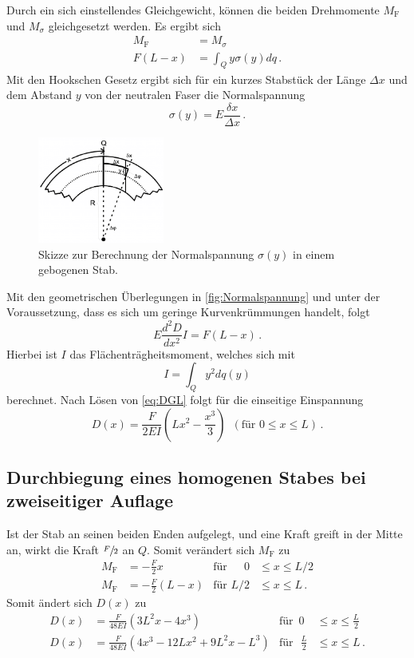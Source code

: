 Durch ein sich einstellendes Gleichgewicht, können die beiden Drehmomente $M_\text{F}$ und $M_\sigma$ gleichgesetzt werden.
Es ergibt sich
\begin{align*}
    M_\text{F} &= M_\sigma \\
    F(L-x) &= \int_{Q} y \sigma(y) dq  \, .
\end{align*}
Mit den Hookschen Gesetz ergibt sich für ein kurzes Stabstück der Länge $\Delta x$ und dem Abstand $y$ 
von der neutralen Faser die Normalspannung
\begin{equation*}
    \sigma (y) = E \frac{\delta x}{\Delta x} \, .
\end{equation*}
\begin{figure}
    \centering
    \includegraphics[height=3.5cm]{Abbildungen/Skizze_Normalspannung.pdf}
    \caption{Skizze zur Berechnung der Normalspannung $\sigma (y)$ in einem gebogenen Stab.}
    \label{fig:Normalspannung}
\end{figure}
Mit den geometrischen Überlegungen in \autoref{fig:Normalspannung}
und unter der Voraussetzung, dass es sich um geringe Kurvenkrümmungen handelt, folgt
\begin{equation} \label{eq:DGL}
    E \frac{d^2 D}{d x^2} I = F(L-x) \, .
\end{equation}
Hierbei ist $I$ das Flächenträgheitsmoment, welches sich mit
\begin{equation*}
    I = \int_{Q} y^2 dq(y)
\end{equation*}
berechnet.
Nach Lösen von \autoref{eq:DGL} folgt für die einseitige Einspannung
\begin{equation}
    D(x) = \frac{F}{2EI}(Lx^2-\frac{x^3}{3}) \, \, \, (\text{für } 0 \leq x \leq L) \, .
    \label{eq:polynom1}
\end{equation}

\subsection{Durchbiegung eines homogenen Stabes bei zweiseitiger Auflage}
Ist der Stab an seinen beiden Enden aufgelegt, und eine Kraft greift in der Mitte an, wirkt die Kraft
$\sfrac{F}{2}$ an $Q$.
Somit verändert sich $M_\text{F}$ zu
\begin{align*}
    M_\text{F} & = - \frac{F}{2} x &\text{für} \, \,\phantom{L/}0 &\leq x \leq L/2 \\
    M_\text{F} & = - \frac{F}{2} (L -x) &\text{für} \, \,L/2 &\leq x \leq L \, .
\end{align*}
Somit ändert sich $D(x)$ zu
\begin{align}
    \label{eq:rechts}
    D(x) & = \frac{F}{48EI}(3L^2x-4x^3) & \text{für} \, \,\,0 &\leq x \leq \frac{L}{2} \\
    \label{eq:links}
    D(x) & = \frac{F}{48EI}(4x^3- 12Lx^2+9L^2x-L^3) & \text{für } \, \, \frac{L}{2} &\leq x \leq L \, .
\end{align}